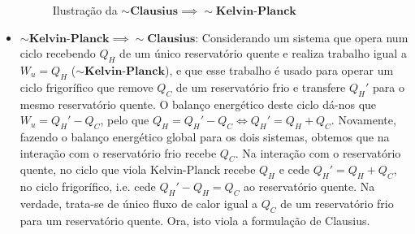 \begin{itemize}
\begin{figure}[H]
        \caption{Ilustração da $\sim \textbf{Clausius} \implies \sim \textbf{Kelvin-Planck}$}
        \label{fig:eq-clausius-kelvin}
    \end{figure}
    
    \item $\sim \textbf{Kelvin-Planck} \implies \sim \textbf{Clausius}$: Considerando um sistema que opera num ciclo recebendo $Q_H$ de um único reservatório quente e realiza trabalho igual a $W_u = Q_H$ ($\sim \textbf{Kelvin-Planck}$), e que esse trabalho é usado para operar um ciclo frigorífico que remove $Q_C$ de um reservatório frio e transfere $Q_H'$ para o mesmo reservatório quente. O balanço energético deste ciclo dá-nos que $W_u = Q_H' - Q_C$, pelo que $Q_H = Q_H' - Q_C \Leftrightarrow Q_H' = Q_H + Q_C$. Novamente, fazendo o balanço energético global para os dois sistemas, obtemos que na interação com o reservatório frio recebe $Q_C$. Na interação com o reservatório quente, no ciclo que viola Kelvin-Planck recebe $Q_H$ e cede $Q_H' = Q_H + Q_C$, no ciclo frigorífico, i.e. cede $Q_H' - Q_H = Q_C$ ao reservatório quente. Na verdade, trata-se de único fluxo de calor igual a $Q_C$ de um reservatório frio para um reservatório quente. Ora, isto viola a formulação de Clausius.

    \begin{figure}[H]
        \centering
\end{figure}
\end{itemize}
